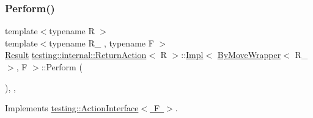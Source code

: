 \subsubsection{\texorpdfstring{Perform()}{Perform()}\hspace{0.1cm}{\footnotesize\ttfamily [1/3]}}
{\footnotesize\ttfamily template$<$typename R $>$ \\
template$<$typename R\+\_\+ , typename F $>$ \\
\mbox{\hyperlink{classtesting_1_1_action_interface_a7477de2fe3e4e01c59db698203acaee7}{Result}} \mbox{\hyperlink{classtesting_1_1internal_1_1_return_action}{testing\+::internal\+::\+Return\+Action}}$<$ R $>$\+::\mbox{\hyperlink{classtesting_1_1internal_1_1_return_action_1_1_impl}{Impl}}$<$ \mbox{\hyperlink{structtesting_1_1internal_1_1_by_move_wrapper}{By\+Move\+Wrapper}}$<$ R\+\_\+ $>$, F $>$\+::Perform (\begin{DoxyParamCaption}\item[{const \mbox{\hyperlink{classtesting_1_1_action_interface_af72720d864da4d606629e83edc003511}{Argument\+Tuple}} \&}]{ }\end{DoxyParamCaption})\hspace{0.3cm}{\ttfamily [inline]}, {\ttfamily [override]}, {\ttfamily [virtual]}}



Implements \mbox{\hyperlink{classtesting_1_1_action_interface_a20f8624fcea1786f2992b358760422a0}{testing\+::\+Action\+Interface$<$ F $>$}}.

\mbox{\label{classtesting_1_1internal_1_1_return_action_1_1_impl_3_01_by_move_wrapper_3_01_r___01_4_00_01_f_01_4_ad49336b69584cc6e90515a1540d2510c}} 
